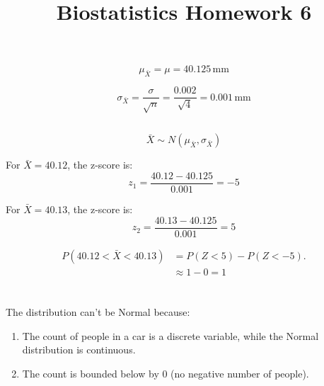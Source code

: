 \documentclass{homework}
\begin{document}
\title{Biostatistics Homework 6}
\author{\chineseName \masterStudentID}
\date{}
\maketitle

\section{}

\subsection{}

\[
\mu_{\bar{X}} = \mu = 40.125 \, \text{mm}
\]

\[
\sigma_{\bar{X}} = \frac{\sigma}{\sqrt{n}} = \frac{0.002}{\sqrt{4}} = 0.001 \, \text{mm}
\]

\subsection{}

\[
\bar{X} \sim N(\mu_{\bar{X}}, \sigma_{\bar{X}})
\]

For \( \bar{X} = 40.12 \), the z-score is:
\[
z_1 = \frac{40.12 - 40.125}{0.001} = -5
\]

For \( \bar{X} = 40.13 \), the z-score is:
\[
z_2 = \frac{40.13 - 40.125}{0.001} = 5
\]

\begin{align*}
    P(40.12 < \bar{X} < 40.13) &= P(Z < 5) - P(Z < -5). \\
    &\approx 1 - 0 = 1
\end{align*}

\section{}

\subsection{}

The distribution can't be Normal because:

\begin{enumerate}
    \item The count of people in a car is a discrete variable, while the Normal distribution is continuous.
    \item The count is bounded below by 0 (no negative number of people).
\end{enumerate}
\end{document}
